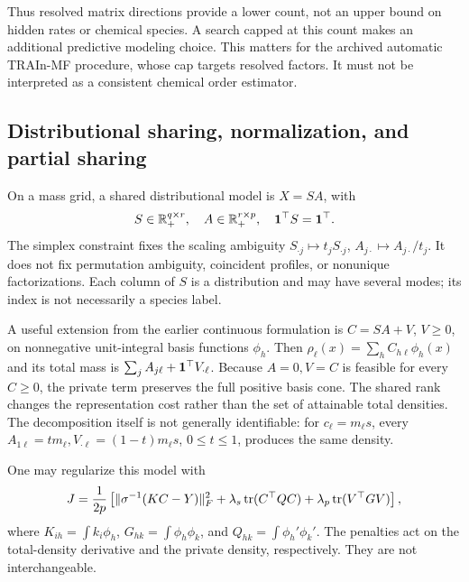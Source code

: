 Thus resolved matrix directions provide a lower count, not an upper bound on hidden rates or chemical species. A search capped at this count makes an additional predictive modeling choice. This matters for the archived automatic TRAIn-MF procedure, whose cap targets resolved factors. It must not be interpreted as a consistent chemical order estimator.

\subsection{Distributional sharing, normalization, and partial sharing}\label{sec:sharing}
On a mass grid, a shared distributional model is $X=SA$, with
\begin{equation}\label{eq:mfconstraints}
 S\in\mathbb{R}_+^{q\times r},\quad A\in\mathbb{R}_+^{r\times p},\quad
 \mathbf{1}^\top S=\mathbf{1}^\top.
\end{equation}
The simplex constraint fixes the scaling ambiguity $S_{\cdot j}\mapsto t_jS_{\cdot j}$, $A_{j\cdot}\mapsto A_{j\cdot}/t_j$. It does not fix permutation ambiguity, coincident profiles, or nonunique factorizations. Each column of $S$ is a distribution and may have several modes; its index is not necessarily a species label.

A useful extension from the earlier continuous formulation is $C=SA+V$, $V\geq0$, on nonnegative unit-integral basis functions $\phi_h$. Then $\rho_\ell(x)=\sum_h C_{h\ell}\phi_h(x)$ and its total mass is $\sum_j A_{j\ell}+\mathbf{1}^\top V_{\cdot\ell}$. Because $A=0,V=C$ is feasible for every $C\geq0$, the private term preserves the full positive basis cone. The shared rank changes the representation cost rather than the set of attainable total densities. The decomposition itself is not generally identifiable: for $c_\ell=m_\ell s$, every $A_{1\ell}=tm_\ell,V_{\cdot\ell}=(1-t)m_\ell s$, $0\leq t\leq1$, produces the same density.

One may regularize this model with
\begin{equation}\label{eq:partial}
 J=\frac{1}{2p}\left[\|\sigma^{-1}(KC-Y)\|_F^2+
 \lambda_s\operatorname{tr}(C^\top QC)+\lambda_p\operatorname{tr}(V^\top GV)\right],
\end{equation}
where $K_{ih}=\int k_i\phi_h$, $G_{hk}=\int\phi_h\phi_k$, and $Q_{hk}=\int\phi_h'\phi_k'$. The penalties act on the total-density derivative and the private density, respectively. They are not interchangeable.

